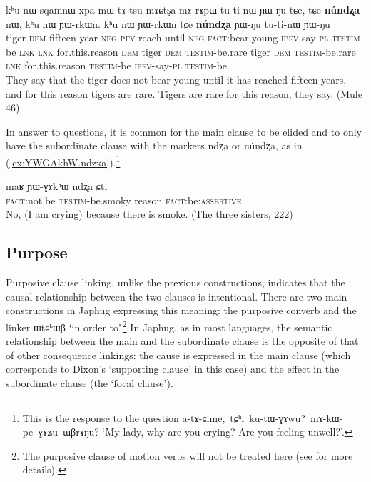 \documentclass[oldfontcommands,oneside,a4paper,11pt]{article}
\newcommand{\ipa}[1]{{\phon \mbox{#1}}} %
\newcommand{\refb}[1]{(\ref{#1})}
\begin{document}
\begin{exe}
\ex \label{ex:sqamnWxpa.mWtAtsu}
\gll
\ipa{kʰu}  	\ipa{nɯ}  	\ipa{sqamnɯ-xpa}  	\ipa{mɯ-tɤ-tsu}  	\ipa{mɤɕtʂa}  	\ipa{mɤ-rɤpɯ}  	\ipa{tu-ti-nɯ}  	\ipa{ɲɯ-ŋu}  	\ipa{tɕe,}  	\ipa{tɕe}  	\textbf{\ipa{núndʐa}}  	\ipa{nɯ,}  	\ipa{kʰu}  	\ipa{nɯ}  	\ipa{ɲɯ-rkɯn.}  	\ipa{kʰu}  	\ipa{nɯ}  	\ipa{ɲɯ-rkɯn}  	\ipa{tɕe}  	\textbf{\ipa{núndʐa}}  	\ipa{ɲɯ-ŋu}  	\ipa{tu-ti-nɯ}  	\ipa{ɲɯ-ŋu}  \\
tiger \textsc{dem} fifteen-year \textsc{neg-pfv}-reach until \textsc{neg-fact}:bear.young \textsc{ipfv}-say-\textsc{pl} \textsc{testim}-be \textsc{lnk} \textsc{lnk} for.this.reason \textsc{dem} tiger \textsc{dem} \textsc{testim}-be.rare tiger \textsc{dem} \textsc{testim}-be.rare \textsc{lnk} for.this.reason \textsc{testim}-be \textsc{ipfv}-say-\textsc{pl} \textsc{testim}-be
\\
\glt They say that the tiger does not bear young until it has reached fifteen years, and for this reason tigers are rare. Tigers are rare for this reason, they say. (Mule 46)
\end{exe} 
In answer to questions, it is common for the main clause to be elided and to only have the subordinate clause with the markers \ipa{ndʐa} or \ipa{núndʐa}, as in \refb{ex:YWGAkhW.ndzxa}.\footnote{This is the response to the question \ipa{a-tɤ-ɕime, tɕʰi ku-tɯ-ɣɤwu? mɤ-kɯ-pe ɣɤʑu ɯβrɤŋu?} `My lady, why are you crying? Are you feeling unwell?'.}

\begin{exe}
\ex \label{ex:YWGAkhW.ndzxa}
\gll
\ipa{maʁ}   	\ipa{ɲɯ-ɣɤkʰɯ}   	\ipa{ndʐa}   	\ipa{ɕti}   \\
\textsc{fact}:not.be \textsc{testim}-be.smoky reason \textsc{fact}:be:\textsc{assertive} \\
\glt No, (I am crying) because there is smoke. (The three sisters, 222) 
\end{exe} 
 

\subsection{Purpose} \label{sec:purposive}

Purposive clause linking, unlike the previous constructions, indicates that the causal relationship between the two clauses is intentional. There are two main constructions in Japhug expressing this meaning: the purposive converb and the linker \ipa{ɯtɕʰɯβ} `in order to'.\footnote{The purposive clause of motion verbs will not be treated here (see \citet{jacques13harmonization} for more details).} In Japhug, as in most languages, the semantic relationship between the main and the subordinate clause is the opposite of that of other consequence linkings: the cause is expressed in the main clause (which corresponds to Dixon's `supporting clause' in this case) and the effect in the subordinate clause (the `focal clause').
\end{document}
